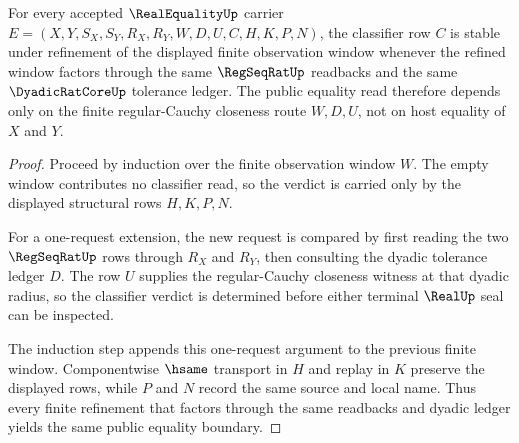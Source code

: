 \begin{theorem}
\label{thm:real-equality-classifier-stability}
For every accepted $\RealEqualityUp$ carrier $E=(X,Y,S_X,S_Y,R_X,R_Y,W,D,U,C,H,K,P,N)$, the classifier row $C$ is stable under refinement of the displayed finite observation window whenever the refined window factors through the same $\RegSeqRatUp$ readbacks and the same $\DyadicRatCoreUp$ tolerance ledger. The public equality read therefore depends only on the finite regular-Cauchy closeness route $W,D,U$, not on host equality of $X$ and $Y$.
\end{theorem}
\begin{proof}
Proceed by induction over the finite observation window $W$. The empty window contributes no classifier read, so the verdict is carried only by the displayed structural rows $H,K,P,N$.

For a one-request extension, the new request is compared by first reading the two $\RegSeqRatUp$ rows through $R_X$ and $R_Y$, then consulting the dyadic tolerance ledger $D$. The row $U$ supplies the regular-Cauchy closeness witness at that dyadic radius, so the classifier verdict is determined before either terminal $\RealUp$ seal can be inspected.

The induction step appends this one-request argument to the previous finite window. Componentwise $\hsame$ transport in $H$ and replay in $K$ preserve the displayed rows, while $P$ and $N$ record the same source and local name. Thus every finite refinement that factors through the same readbacks and dyadic ledger yields the same public equality boundary.
\end{proof}

